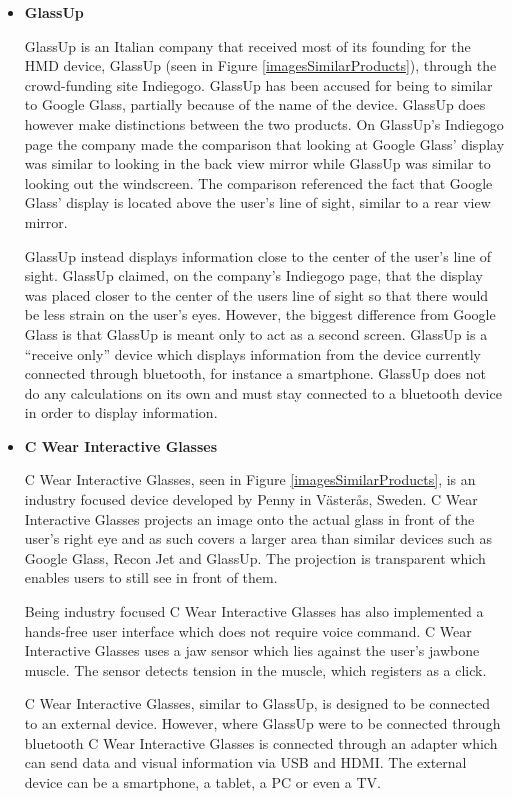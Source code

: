\begin{itemize}
\item \textbf{GlassUp}\cite{glassUp}

GlassUp is an Italian company that received most of its founding for the HMD device, GlassUp (seen in Figure \ref{imagesSimilarProducts}), through the crowd-funding site Indiegogo.\cite{glassUpIndiegogo} GlassUp has been accused for being to similar to Google Glass, partially because of the name of the device.\cite{glassUpLegal} GlassUp does however make distinctions between the two products. On GlassUp's Indiegogo page the company made the comparison that looking at Google Glass' display was similar to looking in the back view mirror while GlassUp was similar to looking out the windscreen. The comparison referenced the fact that Google Glass' display is located above the user's line of sight, similar to a rear view mirror.

GlassUp instead displays information close to the center of the user's line of sight. GlassUp claimed, on the company's Indiegogo page, that the display was placed closer to the center of the users line of sight so that there would be less strain on the user's eyes. However, the biggest difference from Google Glass is that GlassUp is meant only to act as a second screen. GlassUp is a ``receive only'' device which displays information from the device currently connected through bluetooth, for instance a smartphone. GlassUp does not do any calculations on its own and must stay connected to a bluetooth device in order to display information.\cite{glassUpIndiegogo}

\item \textbf{C Wear Interactive Glasses}\cite{penny}

C Wear Interactive Glasses, seen in Figure \ref{imagesSimilarProducts}, is an industry focused device developed by Penny in V{\"a}ster{\aa}s, Sweden. C Wear Interactive Glasses projects an image onto the actual glass in front of the user's right eye and as such covers a larger area than similar devices such as Google Glass, Recon Jet and GlassUp. The projection is transparent which enables users to still see in front of them.\cite{pennyDisplay}

Being industry focused C Wear Interactive Glasses has also implemented a hands-free user interface  which does not require voice command. C Wear Interactive Glasses uses a jaw sensor which lies against the user's jawbone muscle. The sensor detects tension in the muscle, which registers as a click.\cite{pennyProducts}

C Wear Interactive Glasses, similar to GlassUp, is designed to be connected to an external device.\cite{pennyProducts} However, where GlassUp were to be connected through bluetooth C Wear Interactive Glasses is connected through an adapter which can send data and visual information via USB and HDMI. The external device can be a smartphone, a tablet, a PC or even a TV.
\end{itemize}
\hfill

